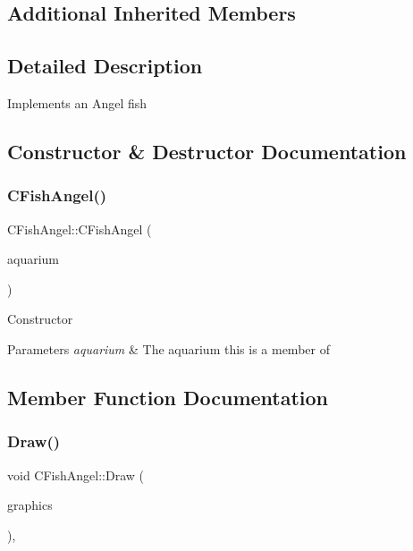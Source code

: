 \subsection*{Additional Inherited Members}


\subsection{Detailed Description}
Implements an Angel fish 

\subsection{Constructor \& Destructor Documentation}
\mbox{\label{class_c_fish_angel_a05e4f975732625fbe4fc898c3ba2adf1}} 
\subsubsection{\texorpdfstring{CFishAngel()}{CFishAngel()}}
{\footnotesize\ttfamily C\+Fish\+Angel\+::\+C\+Fish\+Angel (\begin{DoxyParamCaption}\item[{\mbox{\hyperlink{class_c_aquarium}{C\+Aquarium}} $\ast$}]{aquarium }\end{DoxyParamCaption})}

Constructor 
\begin{DoxyParams}{Parameters}
{\em aquarium} & The aquarium this is a member of \\
\hline
\end{DoxyParams}


\subsection{Member Function Documentation}
\mbox{\label{class_c_fish_angel_a242095541dc288d73ca583b61bc8f417}} 
\subsubsection{\texorpdfstring{Draw()}{Draw()}}
{\footnotesize\ttfamily void C\+Fish\+Angel\+::\+Draw (\begin{DoxyParamCaption}\item[{Gdiplus\+::\+Graphics $\ast$}]{graphics }\end{DoxyParamCaption})\hspace{0.3cm}{\ttfamily [override]}, {\ttfamily [virtual]}}


